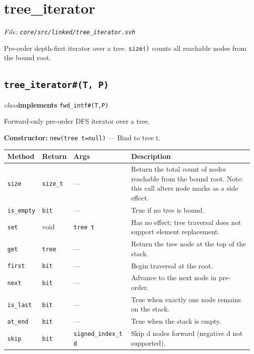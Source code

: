 \documentclass[11pt,letterpaper]{report}
\begin{document}
\section{tree\_iterator}
\noindent\small\textit{File: \texttt{core/src/linked/tree\_iterator.svh}}\par

Pre-order depth-first iterator over a tree. \texttt{size()} counts all reachable nodes from the bound root.

\subsection*{\texttt{tree\_iterator\#(T, P)}}
\noindent\small\textit{class}\quad \textbf{implements} \texttt{fwd\_intf\#(T,P)}\par

Forward-only pre-order DFS iterator over a tree.

\noindent\textbf{Constructor:} \texttt{new(tree t=null)} --- Bind to tree t.

\begin{xltabular}{\linewidth}{>{\small}p{1.35in} >{\small}p{1.25in} >{\small}p{0.95in} >{\small}X}
\toprule
\textbf{Method} & \textbf{Return} & \textbf{Args} & \textbf{Description} \\
\midrule
\endhead
\bottomrule
\endfoot
\texttt{size} & \texttt{size\_t} & --- & Return the total count of nodes reachable from the bound root. Note: this call alters node marks as a side effect. \\
\texttt{is\_empty} & \texttt{bit} & --- & True if no tree is bound. \\
\texttt{set} & void & \texttt{tree t} & Has no effect; tree traversal does not support element replacement. \\
\texttt{get} & \texttt{tree} & --- & Return the tree node at the top of the stack. \\
\texttt{first} & \texttt{bit} & --- & Begin traversal at the root. \\
\texttt{next} & \texttt{bit} & --- & Advance to the next node in pre-order. \\
\texttt{is\_last} & \texttt{bit} & --- & True when exactly one node remains on the stack. \\
\texttt{at\_end} & \texttt{bit} & --- & True when the stack is empty. \\
\texttt{skip} & \texttt{bit} & \texttt{signed\_index\_t d} & Skip d nodes forward (negative d not supported). \\
\end{xltabular}
\end{document}
